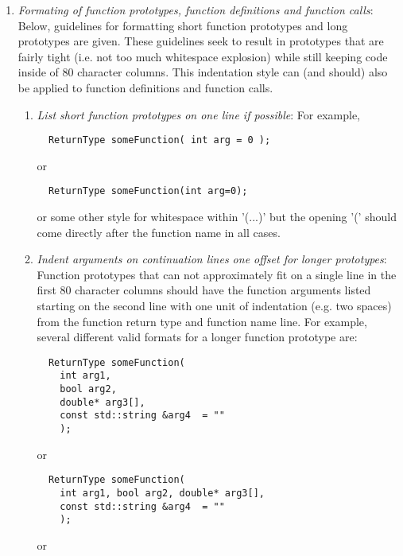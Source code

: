 \begin{enumerate}
{}\item\textit{Formating of function prototypes, function definitions and
function calls}: Below, guidelines for formatting short function prototypes
and long prototypes are given.  These guidelines seek to result in prototypes
that are fairly tight (i.e. not too much whitespace explosion) while still
keeping code inside of 80 character columns.  This indentation style can (and
should) also be applied to function definitions and function calls.

  \begin{enumerate}

  {}\item\textit{List short function prototypes on one line if possible}: For
  example,

  {\small\begin{verbatim}
  ReturnType someFunction( int arg = 0 );
  \end{verbatim}}

  or 

  {\small\begin{verbatim}
  ReturnType someFunction(int arg=0);
  \end{verbatim}}

  or some other style for whitespace within '(...)' but the opening '(' should
  come directly after the function name in all cases.

  {}\item\textit{Indent arguments on continuation lines one offset for longer
  prototypes}: Function prototypes that can not approximately fit on a single
  line in the first 80 character columns should have the function arguments
  listed starting on the second line with one unit of indentation (e.g. two
  spaces) from the function return type and function name line.  For example,
  several different valid formats for a longer function prototype are:

  {\small\begin{verbatim}
  ReturnType someFunction(
    int arg1,
    bool arg2,
    double* arg3[],
    const std::string &arg4  = ""
    );
  \end{verbatim}}
  
  or
  
  {\small\begin{verbatim}
  ReturnType someFunction(
    int arg1, bool arg2, double* arg3[],
    const std::string &arg4  = ""
    );
  \end{verbatim}}
  
  or
  

\end{enumerate}
\end{enumerate}
